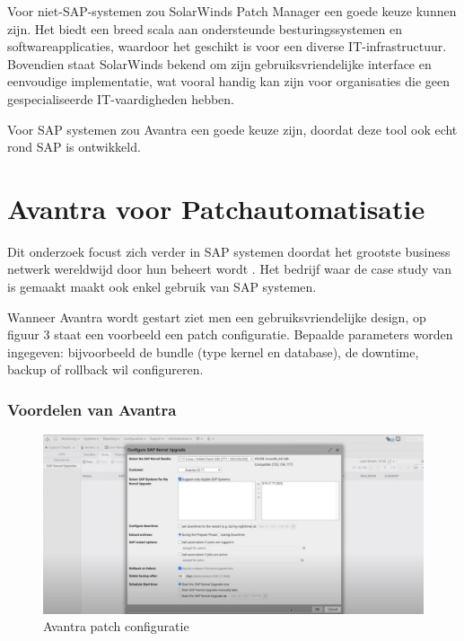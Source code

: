 \documentclass[dutch,dit,thesis]{hogentreport}
\begin{document}
 Voor niet-SAP-systemen zou SolarWinds Patch Manager een goede keuze kunnen zijn. Het biedt een breed scala aan ondersteunde besturingssystemen en softwareapplicaties, waardoor het geschikt is voor
  een diverse IT-infrastructuur. Bovendien staat SolarWinds bekend om zijn gebruiksvriendelijke interface en eenvoudige implementatie, wat vooral handig kan zijn voor organisaties die geen gespecialiseerde IT-vaardigheden hebben.
 
Voor SAP systemen zou Avantra een goede keuze zijn, doordat deze tool ook echt rond SAP is ontwikkeld. \\

\section{Avantra voor Patchautomatisatie}

Dit onderzoek focust zich verder in SAP systemen doordat het grootste business netwerk wereldwijd door hun beheert wordt \autocite{Laborde2024}. Het bedrijf waar de case study van is gemaakt maakt ook enkel gebruik van SAP systemen.

Wanneer Avantra wordt gestart ziet men een gebruiksvriendelijke design, op figuur 3 staat een voorbeeld een patch configuratie. Bepaalde parameters worden ingegeven: bijvoorbeeld de bundle (type kernel en database), de downtime, backup of 
 rollback wil configureren. \\ 


\subsubsection{Voordelen van Avantra}
\begin{figure}[htbp]
    \centering
    \includegraphics[width=\textwidth]{avantra1.png}
    \caption{Avantra patch configuratie }
     \label{fig:avantra1}
\end{figure}
\end{document}

